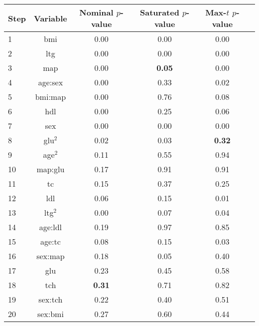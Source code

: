 \begin{tabular}{|l|c|c|c|c|c|}
\hline
 Step & Variable &  Nominal $p$-value &  Saturated $p$-value &  Max-$t$ $p$-value \\
\hline
    1 &      bmi &            0.00 &              0.00 &         0.00 \\
    2 &      ltg &            0.00 &              0.00 &         0.00 \\
    3 &      map &            0.00 &             {\bf 0.05} &         0.00 \\
    4 &  age:sex &            0.00 &              0.33 &         0.02 \\
    5 &  bmi:map &            0.00 &              0.76 &         0.08 \\
    6 &      hdl &            0.00 &              0.25 &         0.06 \\
    7 &      sex &            0.00 &              0.00 &         0.00 \\
    8 &    glu$^2$ &            0.02 &              0.03 &         {\bf 0.32} \\
    9 &    age$^2$ &            0.11 &              0.55 &         0.94 \\
   10 &  map:glu &            0.17 &              0.91 &         0.91 \\
   11 &       tc &            0.15 &              0.37 &         0.25 \\
   12 &      ldl &            0.06 &              0.15 &         0.01 \\
   13 &    ltg$^2$ &            0.00 &              0.07 &         0.04 \\
   14 &  age:ldl &            0.19 &              0.97 &         0.85 \\
   15 &   age:tc &            0.08 &              0.15 &         0.03 \\
   16 &  sex:map &            0.18 &              0.05 &         0.40 \\
   17 &      glu &            0.23 &              0.45 &         0.58 \\
   18 &      tch &       {\bf     0.31} &              0.71 &         0.82 \\
   19 &  sex:tch &            0.22 &              0.40 &         0.51 \\
   20 &  sex:bmi &            0.27 &              0.60 &         0.44 \\
\hline
\end{tabular}

